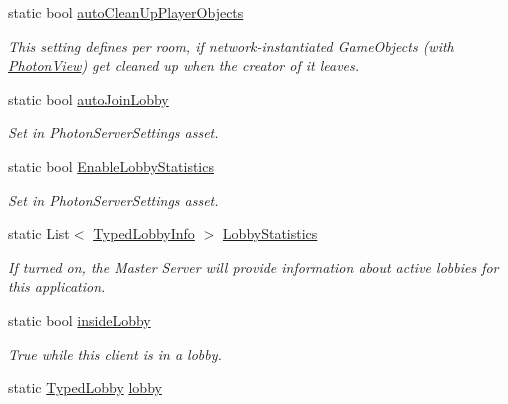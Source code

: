 \begin{DoxyCompactItemize}
static bool \hyperlink{class_photon_network_a6c6fb3cd57d7e2a13d1fc354db0c1fd7}{auto\+Clean\+Up\+Player\+Objects}
\begin{DoxyCompactList}\small\item\em This setting defines per room, if network-\/instantiated Game\+Objects (with \hyperlink{class_photon_view}{Photon\+View}) get cleaned up when the creator of it leaves. \end{DoxyCompactList}\item 
static bool \hyperlink{class_photon_network_ad534d4da7222bd8a6d8423cbd238d7f4}{auto\+Join\+Lobby}
\begin{DoxyCompactList}\small\item\em Set in Photon\+Server\+Settings asset. \end{DoxyCompactList}\item 
static bool \hyperlink{class_photon_network_a8ce4ab4a44e705199ff795b2eb9b395b}{Enable\+Lobby\+Statistics}
\begin{DoxyCompactList}\small\item\em Set in Photon\+Server\+Settings asset. \end{DoxyCompactList}\item 
static List$<$ \hyperlink{class_typed_lobby_info}{Typed\+Lobby\+Info} $>$ \hyperlink{class_photon_network_abdced09cccf61ae817cb97705ffce137}{Lobby\+Statistics}
\begin{DoxyCompactList}\small\item\em If turned on, the Master Server will provide information about active lobbies for this application. \end{DoxyCompactList}\item 
static bool \hyperlink{class_photon_network_a8ad64b1a76c7918bbe5642639afff458}{inside\+Lobby}
\begin{DoxyCompactList}\small\item\em True while this client is in a lobby. \end{DoxyCompactList}\item 
static \hyperlink{class_typed_lobby}{Typed\+Lobby} \hyperlink{class_photon_network_a3af7f8d0082599e6e3a56a5b1481a505}{lobby}

\end{DoxyCompactItemize}
